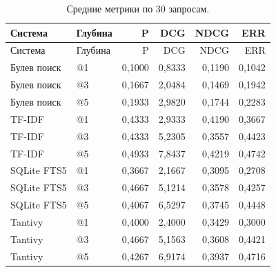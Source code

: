\begin{longtable}{llrrrr}
\caption{Средние метрики по 30 запросам.}\\
\toprule Система & Глубина & P & DCG & NDCG & ERR\\\midrule\endfirsthead
\toprule Система & Глубина & P & DCG & NDCG & ERR\\\midrule\endhead
Булев поиск & @1 & 0,1000 & 0,8333 & 0,1190 & 0,1042\\
Булев поиск & @3 & 0,1667 & 2,0484 & 0,1469 & 0,1942\\
Булев поиск & @5 & 0,1933 & 2,9820 & 0,1744 & 0,2283\\
\midrule
TF-IDF & @1 & 0,4333 & 2,9333 & 0,4190 & 0,3667\\
TF-IDF & @3 & 0,4333 & 5,2305 & 0,3557 & 0,4423\\
TF-IDF & @5 & 0,4933 & 7,8437 & 0,4219 & 0,4742\\
\midrule
SQLite FTS5 & @1 & 0,3667 & 2,1667 & 0,3095 & 0,2708\\
SQLite FTS5 & @3 & 0,4667 & 5,1214 & 0,3578 & 0,4257\\
SQLite FTS5 & @5 & 0,4067 & 6,5297 & 0,3745 & 0,4448\\
\midrule
Tantivy & @1 & 0,4000 & 2,4000 & 0,3429 & 0,3000\\
Tantivy & @3 & 0,4667 & 5,1563 & 0,3608 & 0,4421\\
Tantivy & @5 & 0,4267 & 6,9174 & 0,3937 & 0,4716\\
\bottomrule
\end{longtable}
